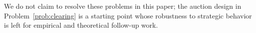 
We do not claim to resolve these problems in this paper; the auction
design in Problem~\ref{prob:clearing} is a starting point whose robustness
to strategic behavior is left for empirical and theoretical follow-up work.
